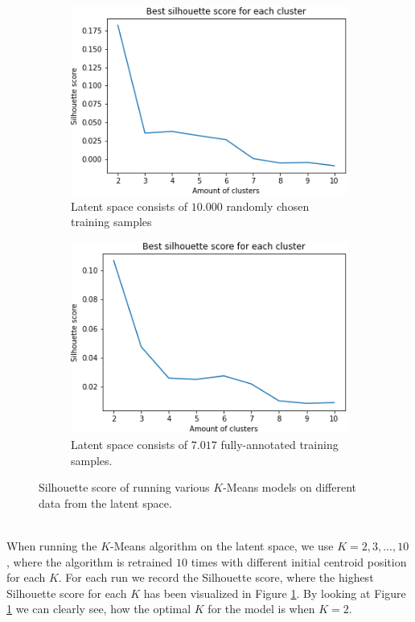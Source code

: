 \documentclass[./main.tex]{subfiles}
\begin{document}
\\
\begin{figure}[htbp]
    \centering
    \begin{subfigure}{7 cm}
        \centering
        \includegraphics[width = 7 cm]{entities/silhouette_score_all_skeletons.png}
        \caption{Latent space consists of $10.000$ randomly chosen training samples}
        \label{fig:silhouette_all}
    \end{subfigure}
    \begin{subfigure}{7 cm}
        \centering
        \includegraphics[width = 7 cm]{entities/silhouette_score_full_skeletons.png}
        \caption{Latent space consists of $7.017$ fully-annotated training samples.}
        \label{fig:silhouette_full}
    \end{subfigure}
    \caption{Silhouette score of running various $K$-Means models on different data from the latent space.}
\end{figure}
\\
When running the $K$-Means algorithm on the latent space, we use $K = 2, 3, ..., 10$, where the algorithm is retrained $10$ times with different initial centroid position for each $K$. For each run we record the Silhouette score, where the highest Silhouette score for each $K$ has been visualized in Figure \ref{fig:silhouette_all}. By looking at Figure \ref{fig:silhouette_all} we can clearly see, how the optimal $K$ for the model is when $K = 2$.
\\
\end{document}
